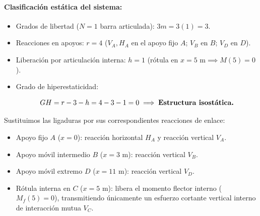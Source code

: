 \paragraph{Clasificación estática del sistema:}

\begin{itemize}

    \item Grados de libertad ($N=1$ barra articulada): $3m = 3(1) = 3$.

    \item Reacciones en apoyos: $r = 4$ ($V_A, H_A$ en el apoyo fijo $A$; $V_B$ en $B$; $V_D$ en $D$).

    \item Liberación por articulación interna: $h = 1$ (rótula en $x=5\text{ m} \implies M(5) = 0$).

    \item Grado de hiperestaticidad:

          \[

              GH = r - 3 - h = 4 - 3 - 1 = 0 \implies \text{\textbf{Estructura isostática.}}

          \]

\end{itemize}






Sustituimos las ligaduras por sus correspondientes reacciones de enlace:

\begin{itemize}

    \item Apoyo fijo $A$ ($x = 0$): reacción horizontal $H_A$ y reacción vertical $V_A$.

    \item Apoyo móvil intermedio $B$ ($x = 3\text{ m}$): reacción vertical $V_B$.

    \item Apoyo móvil extremo $D$ ($x = 11\text{ m}$): reacción vertical $V_D$.

    \item Rótula interna en $C$ ($x = 5\text{ m}$): libera el momento flector interno ($M_f(5) = 0$), transmitiendo únicamente un esfuerzo cortante vertical interno de interacción mutua $V_C$.

\end{itemize}



